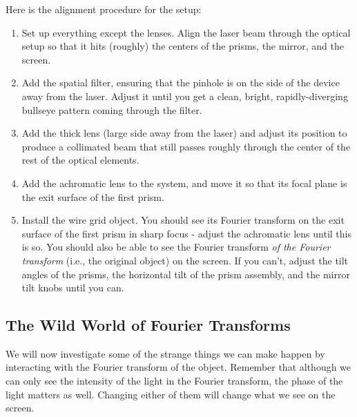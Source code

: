 \documentclass[]{manual}
\begin{document}
    Here is the alignment procedure for the setup:
    \begin{enumerate}
        \item Set up everything except the lenses.
        Align the laser beam through the optical setup so that it hits (roughly) the centers of the prisms, the mirror, and the screen.
        \item Add the spatial filter, ensuring that the pinhole is on the side of the device away from the laser.
        Adjust it until you get a clean, bright, rapidly-diverging bullseye pattern coming through the filter.
        \item Add the thick lens (large side away from the laser) and adjust its position to produce a collimated beam that still passes roughly through the center of the rest of the optical elements.
        \item Add the achromatic lens to the system, and move it so that its focal plane is the exit surface of the first prism.
        \item Install the wire grid object.
        You should see its Fourier transform on the exit surface of the first prism in sharp focus - adjust the achromatic lens until this is so.
        You should also be able to see the Fourier transform \textit{of the Fourier transform} (i.e., the original object) on the screen.
        If you can't, adjust the tilt angles of the prisms, the horizontal tilt of the prism assembly, and the mirror tilt knobs until you can.
    \end{enumerate}


    \subsection{The Wild World of Fourier Transforms}

    We will now investigate some of the strange things we can make happen by interacting with the Fourier transform of the object.
    Remember that although we can only see the intensity of the light in the Fourier transform, the phase of the light matters as well.
    Changing either of them will change what we see on the screen.
\end{document}

